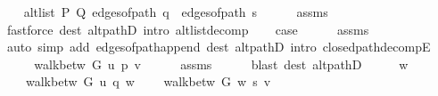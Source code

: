 \begin{isabellebody}
\ \ \isamarkupfalse%
\ {\isachardoublequoteopen}alt{\isacharunderscore}{\kern0pt}list\ P\ Q\ {\isacharparenleft}{\kern0pt}edges{\isacharunderscore}{\kern0pt}of{\isacharunderscore}{\kern0pt}path\ q\ {\isacharat}{\kern0pt}\ edges{\isacharunderscore}{\kern0pt}of{\isacharunderscore}{\kern0pt}path\ s{\isacharparenright}{\kern0pt}{\isachardoublequoteclose}\isanewline
\ \ \ \ \isamarkupfalse%
\ assms{\isacharparenleft}{\kern0pt}{}{\isacharcomma}{\kern0pt}\ {}{\isacharparenright}{\kern0pt}\isanewline
\ \ \ \ \isamarkupfalse%
\ {\isacharparenleft}{\kern0pt}fastforce\ dest{\isacharcolon}{\kern0pt}\ alt{\isacharunderscore}{\kern0pt}pathD{\isacharparenleft}{\kern0pt}{}{\isacharparenright}{\kern0pt}\ intro{\isacharcolon}{\kern0pt}\ alt{\isacharunderscore}{\kern0pt}list{\isacharunderscore}{\kern0pt}decomp{\isacharparenright}{\kern0pt}\isanewline
\ \ \isamarkupfalse%
\ {\isacharquery}{\kern0pt}case\isanewline
\ \ \ \ \isamarkupfalse%
\ assms\isanewline
\ \ \ \ \isamarkupfalse%
\ {\isacharparenleft}{\kern0pt}auto\ simp\ add{\isacharcolon}{\kern0pt}\ edges{\isacharunderscore}{\kern0pt}of{\isacharunderscore}{\kern0pt}path{\isacharunderscore}{\kern0pt}append{\isacharunderscore}{\kern0pt}{}\ dest{\isacharcolon}{\kern0pt}\ alt{\isacharunderscore}{\kern0pt}pathD{\isacharparenleft}{\kern0pt}{}{\isacharparenright}{\kern0pt}\ intro{\isacharcolon}{\kern0pt}\ closed{\isacharunderscore}{\kern0pt}path{\isacharunderscore}{\kern0pt}decompE{\isacharunderscore}{\kern0pt}{}{\isacharparenright}{\kern0pt}\isanewline
{}\isamarkupfalse%
\isanewline
\ \ \isamarkupfalse%
\ {}\isanewline
\ \ \isamarkupfalse%
\ {\isachardoublequoteopen}walk{\isacharunderscore}{\kern0pt}betw\ G\ u\ p\ v{\isachardoublequoteclose}\isanewline
\ \ \ \ \isamarkupfalse%
\ assms{\isacharparenleft}{\kern0pt}{}{\isacharparenright}{\kern0pt}\isanewline
\ \ \ \ \isamarkupfalse%
\ {\isacharparenleft}{\kern0pt}blast\ dest{\isacharcolon}{\kern0pt}\ alt{\isacharunderscore}{\kern0pt}pathD{\isacharparenleft}{\kern0pt}{}{\isacharparenright}{\kern0pt}{\isacharparenright}{\kern0pt}\isanewline
\ \ \isamarkupfalse%
\ \isamarkupfalse%
\ w\ \isanewline
\ \ \ \ {\isachardoublequoteopen}walk{\isacharunderscore}{\kern0pt}betw\ G\ u\ q\ w{\isachardoublequoteclose}\isanewline
\ \ \ \ {\isachardoublequoteopen}walk{\isacharunderscore}{\kern0pt}betw\ G\ w\ s\ v{\isachardoublequoteclose}\isanewline

\end{isabellebody}
